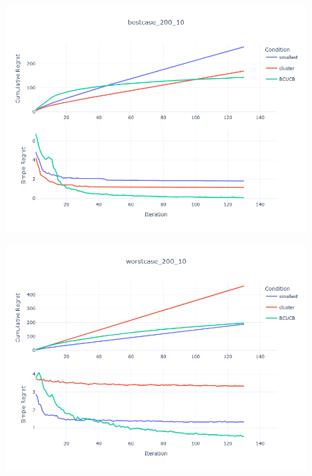 \documentclass[opre,sglanonrev]{informs4}
\begin{document}
\begin{figure}[htbp]
    \centering
    \begin{minipage}[t]{0.48\textwidth}
        \centering
        \includegraphics[width=\textwidth]{figures/best_200_10.png}
        \label{}
    \end{minipage}
    \hfill
    \begin{minipage}[t]{0.48\textwidth}
        \centering
        \includegraphics[width=\textwidth]{figures/worst_200_10.png}
        \label{}
    \end{minipage}
    \begin{minipage}[t]{0.48\textwidth}
        \centering

\end{minipage}
\end{figure}
\end{document}

